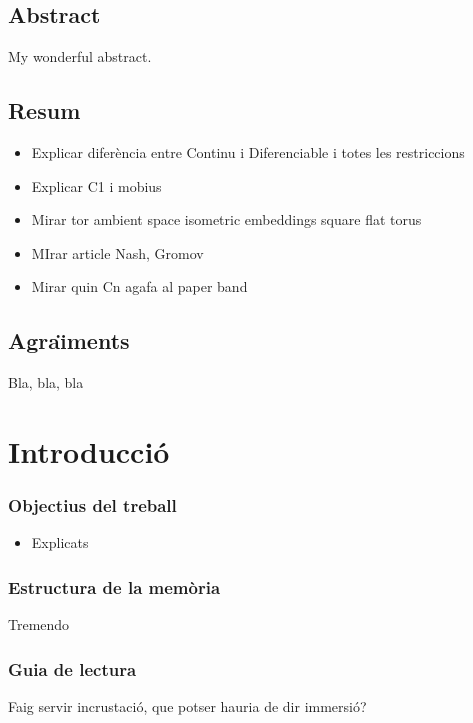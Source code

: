 \documentclass[11pt,a4paper,openright,oneside]{book}
\numberwithin{equation}{section}
\theoremstyle{definition}
\begin{document}
\newpage
{} 

\section*{Abstract}
My wonderful abstract.

\section*{Resum}
\begin{itemize}
    \item Explicar diferència entre Continu i Diferenciable i totes les restriccions
    \item Explicar C1 i mobius
    \item Mirar tor ambient space isometric embeddings square flat torus
    \item MIrar article Nash, Gromov
    \item Mirar quin Cn agafa al paper band
\end{itemize}

\newpage 


\section*{Agra\"{\i}ments}

Bla, bla, bla
\newpage

\tableofcontents

\newpage

\chapter{Introducci\'o}



\subsection*{Objectius del treball}

\begin{itemize}
    \item Explicats
\end{itemize}

\subsection*{Estructura de la mem\`oria}
Tremendo

\subsection*{Guia de lectura}
Faig servir incrustació, que potser hauria de dir immersió?
\end{document}
